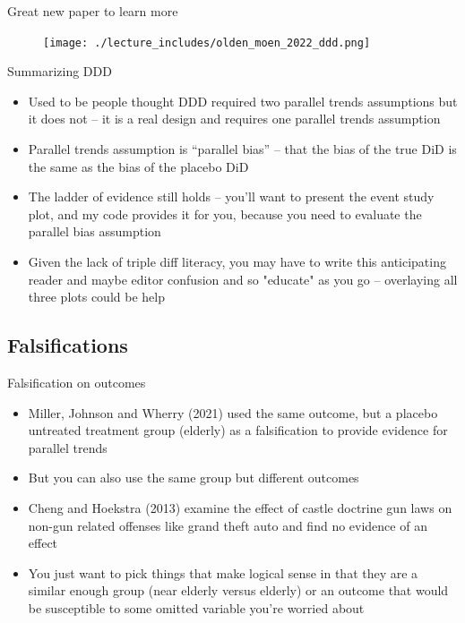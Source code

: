 \documentclass{beamer}
\begin{document}
\begin{frame}{Great new paper to learn more}

\begin{figure}
\texttt{[image: ./lecture\_includes/olden\_moen\_2022\_ddd.png]}
\end{figure}

\end{frame}


\begin{frame}{Summarizing DDD}

\begin{itemize}
\item Used to be people thought DDD required two parallel trends assumptions but it does not -- it is a real design and requires one parallel trends assumption
\item Parallel trends assumption is ``parallel bias'' -- that the bias of the true DiD is the same as the bias of the placebo DiD
\item The ladder of evidence still holds -- you'll want to present the event study plot, and my code provides it for you, because you need to evaluate the parallel bias assumption
\item Given the lack of triple diff literacy, you may have to write this anticipating reader and maybe editor confusion and so "educate" as you go -- overlaying all three plots could be help

\end{itemize}

\end{frame}


\subsection{Falsifications}

\begin{frame}{Falsification on outcomes}
	
	\begin{itemize}
	\item Miller, Johnson and Wherry (2021) used the same outcome, but a placebo untreated treatment group (elderly) as a falsification to provide evidence for parallel trends
	\item But you can also use the same group but different outcomes
	\item Cheng and Hoekstra (2013) examine the effect of castle doctrine gun laws on non-gun related offenses like grand theft auto and find no evidence of an effect 
	\item You just want to pick things that make logical sense in that they are a similar enough group (near elderly versus elderly) or an outcome that would be susceptible to some omitted variable you're worried about
	\end{itemize}
\end{frame}
\end{document}
